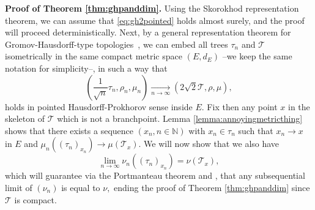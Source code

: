 \documentclass[11pt]{article}
\newcommand{\T}{\mathcal{T}}
\newcommand{\N}{\mathbb{N}}
\begin{document}
\noindent \textbf{Proof of Theorem \ref{thm:ghpanddim}.} Using the Skorokhod representation theorem, we can assume that \eqref{eq:gh2pointed} holds almost surely, and the proof will proceed deterministically. Next, by a general representation theorem for Gromov-Hausdorff-type topologies~\cite[Lemma 2.5]{khezeli2023unified}, we can
embed all trees $\tau_n$ and $ \mathcal{T}$ isometrically in the same compact 
metric space $(E,d_E)$ --we keep the same notation for simplicity--, in such a way that
\begin{equation*}
\left( \frac{1}{\sqrt{n}} \tau_n,\rho_n,\mu_n\right) \underset{n\to\infty}{\longrightarrow} (2\sqrt{2}\T,\rho,\mu),
\end{equation*}
holds in pointed Hausdorff-Prokhorov sense inside $E$. Fix then any point $x$ in the skeleton of $\T$ which is not a branchpoint. Lemma \ref{lemma:annoyingmetricthing} shows that there exists a sequence $(x_n,n\in\N)$ with $x_n\in\tau_n$ such that $x_n \to x$ in $E$ and $\mu_n((\tau_n)_{x_n}) \to \mu(\T_x)$. We will now show that we also have 
\begin{equation}\label{eq:GHPlimofnu} \lim_{n \to \infty} \nu_n( (\tau_n)_{x_n})= \nu(\T_x),\end{equation}
which will guarantee via the Portmanteau theorem and \cite[Proposition 1]{Steph13}, that any subsequential limit of $(\nu_n)$ is equal to $\nu,$ ending the proof of Theorem \ref{thm:ghpanddim} since $ \mathcal{T}$ is compact.

\end{document}
